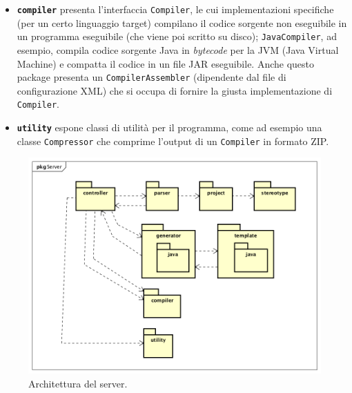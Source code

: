 \begin{itemize}
	\item \textbf{\texttt{compiler}} presenta l'interfaccia \texttt{Compiler}, le cui implementazioni specifiche (per un certo linguaggio target) compilano il codice sorgente non eseguibile in un programma eseguibile (che viene poi scritto su disco); \texttt{JavaCompiler}, ad esempio, compila codice sorgente Java in \emph{bytecode} per la JVM (Java Virtual Machine) e compatta il codice in un file JAR eseguibile. Anche questo package presenta un \texttt{CompilerAssembler} (dipendente dal file di configurazione XML) che si occupa di fornire la giusta implementazione di \texttt{Compiler}.
	\item \textbf{\texttt{utility}} espone classi di utilità per il programma, come ad esempio una classe \texttt{Compressor} che comprime l'output di un \texttt{Compiler} in formato ZIP. %
\end{itemize}

\begin{figure} \label{fig:server_pkg}
	\includegraphics[scale=0.5]{img/server_pkg}
	\caption{Architettura del server.}
\end{figure}



